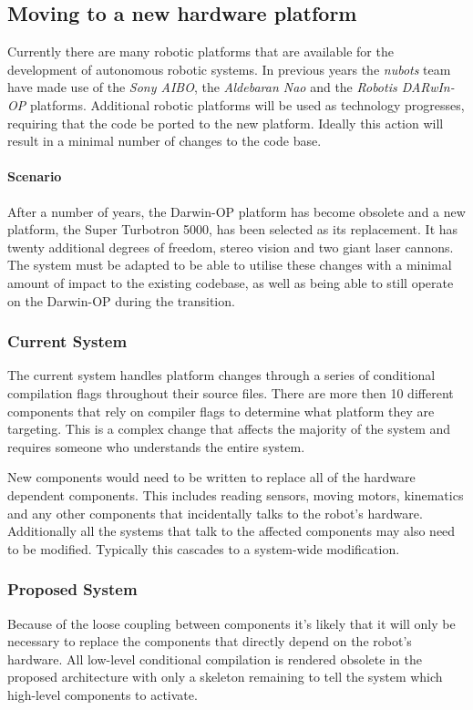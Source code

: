 \documentclass[english,12pt]{scrartcl}
\begin{document}
		\subsection{Moving to a new hardware platform}
			Currently there are many robotic platforms that are available for the development of autonomous
			robotic systems. In previous years the \emph{\gls{nubots}} team have made use of the \emph{Sony AIBO},
			the \emph{Aldebaran Nao} and the \emph{Robotis DARwIn-OP} platforms. Additional robotic platforms will be used as technology progresses, requiring that the code be ported to the new platform.
			Ideally this action will result in a minimal number of changes to the code base.

			\paragraph{Scenario} After a number of years, the Darwin-OP platform has become obsolete and a new platform, the Super Turbotron 5000, has been selected as its replacement. It has twenty
			additional degrees of freedom, stereo vision and two giant laser cannons. The system must be
			adapted to be able to utilise these changes with a minimal amount of impact to the existing codebase, as well as being able to still operate on the Darwin-OP during the transition.

			\subsubsection{Current System}
				The current system handles platform changes through a series of conditional compilation flags throughout their source files.
				There are more then 10 different components that rely on compiler flags to determine what platform they are targeting.
				This is a complex change that affects the majority of the system and requires someone who understands the entire system.
				
				New components would need to be written to replace all of the hardware dependent components. This includes reading sensors, moving motors, kinematics and any other components that incidentally talks to the robot's hardware.
				Additionally all the systems that talk to the affected components may also need to be modified. Typically this cascades to a system-wide modification.

			\subsubsection{Proposed System}
				Because of the loose coupling between components it's likely that it will only be necessary to replace the components that directly depend on the robot's hardware.
				All low-level conditional compilation is rendered obsolete in the proposed architecture with only a skeleton remaining to tell the system which high-level components to activate.
				
\end{document}
